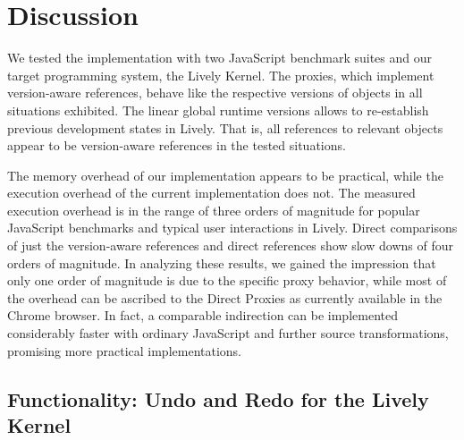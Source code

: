 \chapter{Discussion} \label{sec:DISCUSSION}

We tested the implementation with two JavaScript benchmark suites and our target programming system, the Lively Kernel.
The proxies, which implement version-aware references, behave like the respective versions of objects in all situations exhibited.
The linear global runtime versions allows to re-establish previous development states in Lively.
That is, all references to relevant objects appear to be version-aware references in the tested situations.

The memory overhead of our implementation appears to be practical, while the execution overhead of the current implementation does not.
The measured execution overhead is in the range of three orders of magnitude for popular JavaScript benchmarks and typical user interactions in Lively.
Direct comparisons of just the version-aware references and direct references show slow downs of four orders of magnitude.
In analyzing these results, we gained the impression that only one order of magnitude is due to the specific proxy behavior, while most of the overhead can be ascribed to the Direct Proxies as currently available in the Chrome browser.
In fact, a comparable indirection can be implemented considerably faster with ordinary JavaScript and further source transformations, promising more practical implementations.


\section{Functionality: Undo and Redo for the Lively Kernel}

